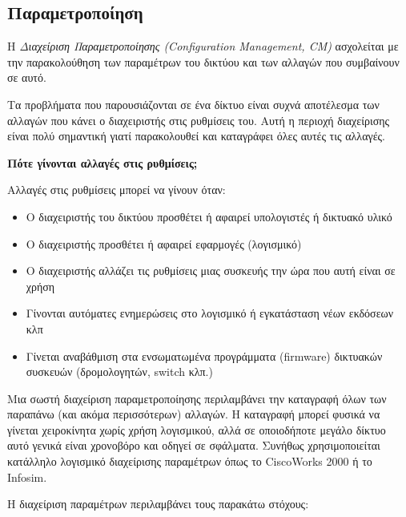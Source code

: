 %
%
\subsection{Παραμετροποίηση}

\begin{inthebox}
H \emph{Διαχείριση Παραμετροποίησης (Configuration Management, CM)} ασχολείται με την παρακολούθηση των παραμέτρων του δικτύου και των αλλαγών που συμβαίνουν σε αυτό.\\
\end{inthebox}

Τα προβλήματα που παρουσιάζονται σε ένα δίκτυο είναι συχνά αποτέλεσμα των αλλαγών που κάνει ο διαχειριστής στις ρυθμίσεις του. Αυτή η περιοχή διαχείρισης είναι πολύ σημαντική γιατί παρακολουθεί και καταγράφει όλες αυτές τις αλλαγές.

\begin{inthebox}
\textbf{Πότε γίνονται αλλαγές στις ρυθμίσεις;}

Αλλαγές στις ρυθμίσεις μπορεί να γίνουν όταν:

\begin{itemize}
\item Ο διαχειριστής του δικτύου προσθέτει ή αφαιρεί υπολογιστές ή δικτυακό υλικό
\item Ο διαχειριστής προσθέτει ή αφαιρεί εφαρμογές (λογισμικό)
\item Ο διαχειριστής αλλάζει τις ρυθμίσεις μιας συσκευής την ώρα που αυτή είναι σε χρήση
\item Γίνονται αυτόματες ενημερώσεις στο λογισμικό ή εγκατάσταση νέων εκδόσεων κλπ
\item Γίνεται αναβάθμιση στα ενσωματωμένα προγράμματα (firmware) δικτυακών συσκευών (δρομολογητών, switch κλπ.)
\end{itemize}

\end{inthebox}

Μια σωστή διαχείριση παραμετροποίησης περιλαμβάνει την καταγραφή όλων των παραπάνω (και ακόμα περισσότερων) αλλαγών. Η καταγραφή μπορεί φυσικά να γίνεται χειροκίνητα χωρίς χρήση λογισμικού, αλλά σε οποιοδήποτε μεγάλο δίκτυο αυτό γενικά είναι χρονοβόρο και οδηγεί σε σφάλματα. Συνήθως χρησιμοποιείται κατάλληλο λογισμικό διαχείρισης παραμέτρων όπως το CiscoWorks 2000 ή το Infosim.

Η διαχείριση παραμέτρων περιλαμβάνει τους παρακάτω στόχους:

